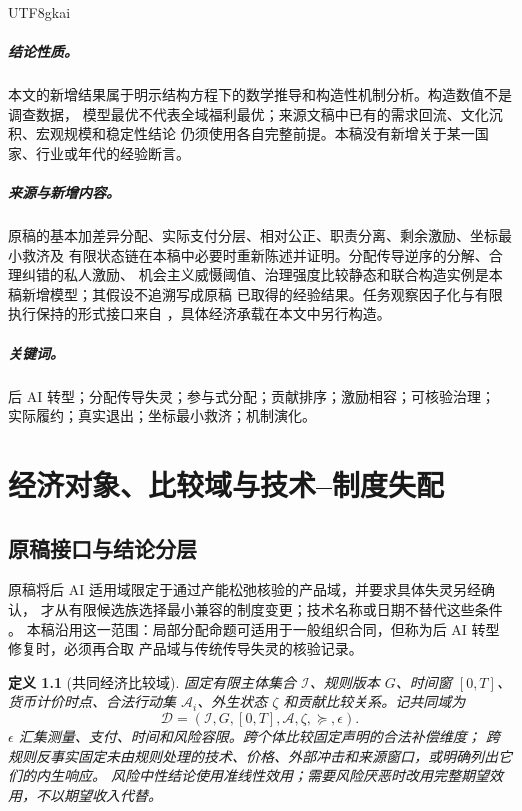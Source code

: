 \documentclass[12pt,a4paper,openany]{report}
\newtheorem{definition}{定义}[chapter]
\newcommand{\Act}{\mathcal A}
\newcommand{\Original}{原稿}
\begin{document}
\begin{CJK*}{UTF8}{gkai}
\paragraph{结论性质。}
本文的新增结果属于明示结构方程下的数学推导和构造性机制分析。构造数值不是调查数据，
模型最优不代表全域福利最优；来源文稿中已有的需求回流、文化沉积、宏观规模和稳定性结论
仍须使用各自完整前提。本稿没有新增关于某一国家、行业或年代的经验断言。

\paragraph{来源与新增内容。}
\Original 的基本加差异分配、实际支付分层、相对公正、职责分离、剩余激励、坐标最小救济及
有限状态链在本稿中必要时重新陈述并证明。分配传导逆序的分解、合理纠错的私人激励、
机会主义威慑阈值、治理强度比较静态和联合构造实例是本稿新增模型；其假设不追溯写成\Original
已取得的经验结果。任务观察因子化与有限执行保持的形式接口来自
\cite{SourceGFramework}，具体经济承载在本文中另行构造。

\paragraph{关键词。}
后 AI 转型；分配传导失灵；参与式分配；贡献排序；激励相容；可核验治理；
实际履约；真实退出；坐标最小救济；机制演化。

\tableofcontents
\clearpage
{}

\chapter{经济对象、比较域与技术--制度失配}
\label{chap:scope}

\section{原稿接口与结论分层}

\Original 将后 AI 适用域限定于通过产能松弛核验的产品域，并要求具体失灵另经确认，
才从有限候选族选择最小兼容的制度变更；技术名称或日期不替代这些条件
\cite[章节“后 AI 条件触发后的最小兼容适用路径”]{SourceMarket}。
本稿沿用这一范围：局部分配命题可适用于一般组织合同，但称为后 AI 转型修复时，必须再合取
产品域与传统传导失灵的核验记录。

\begin{definition}[共同经济比较域]
\label{def:domain}
固定有限主体集合 $\mathcal I$、规则版本 $G$、时间窗 $[0,T]$、货币计价时点、合法行动集
$\Act_i$、外生状态 $\zeta$ 和贡献比较关系。记共同域为
\[
 \mathcal D=(\mathcal I,G,[0,T],\Act,\zeta,\succeq,\epsilon).
\]
$\epsilon$ 汇集测量、支付、时间和风险容限。跨个体比较固定声明的合法补偿维度；
跨规则反事实固定未由规则处理的技术、价格、外部冲击和来源窗口，或明确列出它们的内生响应。
风险中性结论使用准线性效用；需要风险厌恶时改用完整期望效用，不以期望收入代替。
\end{definition}


\end{CJK*}
\end{document}
